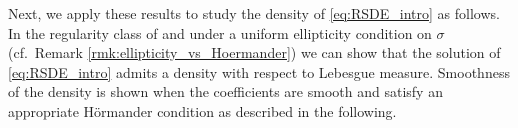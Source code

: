 \documentclass[11pt,a4paper]{article}
\newcommand{\R}{\mathbb{R}}
\theoremstyle{plain}
\begin{document}
\bigskip

Next, we apply these results to study the density of \eqref{eq:RSDE_intro} as follows. In the regularity class of \cite{FHL21} and under a uniform ellipticity condition on $\sigma$ {(cf.\ Remark \ref{rmk:ellipticity_vs_Hoermander})} we can show that the solution of \eqref{eq:RSDE_intro} admits a density with respect to Lebesgue measure. 
Smoothness of the density is shown when the coefficients are smooth and satisfy an appropriate Hörmander condition as described in the following.





\end{document}
